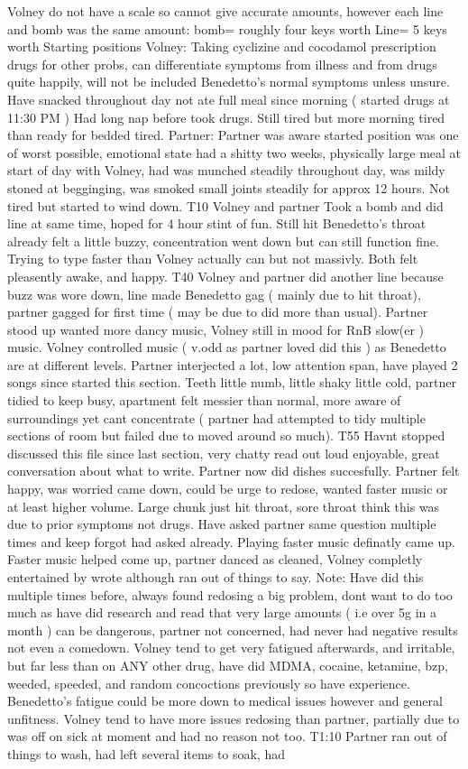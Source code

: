 \documentclass[12pt]{book}
\begin{document}
Volney do not have a scale so cannot give accurate amounts, however each line and bomb was the same amount: bomb= roughly four keys worth Line= 5 keys worth Starting positions Volney: Taking cyclizine and cocodamol prescription drugs for other probs, can differentiate symptoms from illness and from drugs quite happily, will not be included Benedetto's normal symptoms unless unsure. Have snacked throughout day not ate full meal since morning ( started drugs at 11:30 PM ) Had long nap before took drugs. Still tired but more morning tired than ready for bedded tired. Partner: Partner was aware started position was one of worst possible, emotional state had a shitty two weeks, physically large meal at start of day with Volney, had was munched steadily throughout day, was mildy stoned at begginging, was smoked small joints steadily for approx 12 hours. Not tired but started to wind down. T10 Volney and partner Took a bomb and did line at same time, hoped for 4 hour stint of fun. Still hit Benedetto's throat already felt a little buzzy, concentration went down but can still function fine. Trying to type faster than Volney actually can but not massivly. Both felt pleasently awake, and happy. T40 Volney and partner did another line because buzz was wore down, line made Benedetto gag ( mainly due to hit throat), partner gagged for first time ( may be due to did more than usual). Partner stood up wanted more dancy music, Volney still in mood for RnB slow(er ) music. Volney controlled music ( v.odd as partner loved did this ) as Benedetto are at different levels. Partner interjected a lot, low attention span, have played 2 songs since started this section. Teeth little numb, little shaky little cold, partner tidied to keep busy, apartment felt messier than normal, more aware of surroundings yet cant concentrate ( partner had attempted to tidy multiple sections of room but failed due to moved around so much). T55 Havnt stopped discussed this file since last section, very chatty read out loud enjoyable, great conversation about what to write. Partner now did dishes succesfully. Partner felt happy, was worried came down, could be urge to redose, wanted faster music or at least higher volume. Large chunk just hit throat, sore throat think this was due to prior symptoms not drugs. Have asked partner same question multiple times and keep forgot had asked already. Playing faster music definatly came up. Faster music helped come up, partner danced as cleaned, Volney completly entertained by wrote although ran out of things to say. Note: Have did this multiple times before, always found redosing a big problem, dont want to do too much as have did research and read that very large amounts ( i.e over 5g in a month ) can be dangerous, partner not concerned, had never had negative results not even a comedown. Volney tend to get very fatigued afterwards, and irritable, but far less than on ANY other drug, have did MDMA, cocaine, ketamine, bzp, weeded, speeded, and random concoctions previously so have experience. Benedetto's fatigue could be more down to medical issues however and general unfitness. Volney tend to have more issues redosing than partner, partially due to was off on sick at moment and had no reason not too. T1:10 Partner ran out of things to wash, had left several items to soak, had 
\end{document}
